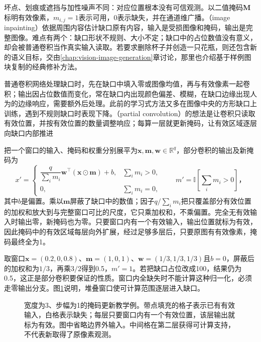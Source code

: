 坏点、划痕或遮挡与加性噪声不同：对应位置根本没有可信观测。以二值掩码$\bm{M}$标明有效像素，$m_{i,j}=1$表示可用，0表示缺失，并在通道维广播。（image inpainting）依据周围内容估计缺口原有内容，输入是受损图像和掩码，输出是完整图像。难点有两个：缺口形状不规则、大小不定；缺口中的占位数值没有意义，却会被普通卷积当作真实输入读取。若要求删除杯子并创造一只花瓶，则还包含新的语义目标，交由\ref{chap:vision-image-generation}章讨论，那里也介绍基于样例图块复制的经典修补方法。

普通卷积网络处理缺口时，先在缺口中填入零或图像均值，再与有效像素一起卷积；输出因占位数值而变化，常在缺口内出现颜色偏差、模糊，在缺口边缘出现人为的边缘响应，需要额外后处理。此前的学习式方法又多在图像中央的方形缺口上训练，遇到不规则缺口时表现下降。（partial convolution）的想法是让卷积只读取有效位置，并按有效位置的数量调整响应；每算一层就更新掩码，让有效区域逐层向缺口内部推进

把一个窗口的输入、掩码和权重分别展平为$\bm{x},\bm{m},\bm{w}\in\mathbb{R}^q$，部分卷积的输出及新掩码为
\begin{equation}
 x'=
 \begin{cases}
 \dfrac{q}{\sum_i m_i}\bm{w}^{\top}(\bm{x}\odot\bm{m})+b,
   &\sum_i m_i>0,\\
 0,&\sum_i m_i=0,
 \end{cases}
 \qquad
 m'=\mathbb{I}\!\left[\sum_i m_i>0\right]\text{，}
 \label{eq:vision-partial-convolution}
\end{equation}
其中$b$是偏置。乘以$\bm{m}$屏蔽了缺口中的数值；因子$q/\sum_i m_i$把只覆盖部分有效位置的加权和放大到与完整窗口可比的尺度，它只乘加权和，不乘偏置。完全无有效输入时输出零，新掩码也为零。只要窗口内有一个有效输入，输出位置就标为有效，因此掩码中的有效区域每层向外扩展，经过足够多层后，只要原图有有效像素，掩码最终全为1。

取窗口$\bm{x}=(0.2,0,0.8)$、$\bm{m}=(1,0,1)$、$\bm{w}=(1/3,1/3,1/3)$且$b=0$，屏蔽后的加权和为$1/3$，再乘$3/2$得到0.5，$m'=1$。若把缺口占位改成100，结果仍为0.5，这正是部分卷积要保证的性质。窗口内全缺失时不能计算这种归一化，必须走零输出分支。图\ref{fig:vision-partial-mask}说明，堆叠窗口使可计算范围逐层进入缺口。

\begin{figure}[htbp]
 \centering
 
 \caption{宽度为3、步幅为1的掩码更新教学例。带点填充的格子表示已有有效输入，白格表示缺失；每层只要窗口内有一个有效位置，该层输出就标为有效。图中省略边界外输入。中间格在第二层获得可计算支持，不代表新取得了原像素观测。}
 \label{fig:vision-partial-mask}
\end{figure}

